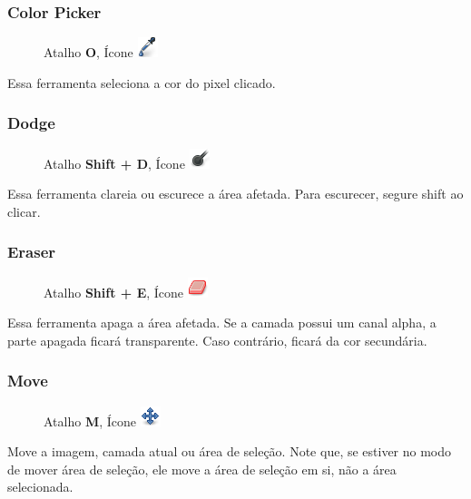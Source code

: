 \documentclass[12pt,onecolumn]{article}
\begin{document}
    \subsubsection{Color Picker}
      \begin{figure}[H]
        Atalho {\bf O}, Ícone
        \includegraphics{gimp-icons/stock-tool-color-picker-22.png}
        \label{fig:color-picker}
      \end{figure}
      Essa ferramenta seleciona a cor do pixel clicado.
      
    \subsubsection{Dodge}
      \begin{figure}[H]
        Atalho {\bf Shift + D}, Ícone
        \includegraphics{gimp-icons/stock-tool-dodge-22.png}
        \label{fig:dodge}
      \end{figure}
      Essa ferramenta clareia ou escurece a área afetada. Para escurecer, segure shift ao clicar.

    \subsubsection{Eraser}
      \begin{figure}[H]
        Atalho {\bf Shift + E}, Ícone
        \includegraphics{gimp-icons/stock-tool-eraser-22.png}
        \label{fig:eraser}
      \end{figure}
      Essa ferramenta apaga a área afetada. Se a camada possui um canal alpha, a parte apagada ficará
      transparente. Caso contrário, ficará da cor secundária.


    \subsubsection{Move}
      \begin{figure}[H]
        Atalho {\bf M}, Ícone
        \includegraphics{gimp-icons/stock-tool-move-22.png}
        \label{fig:move}
      \end{figure}
      Move a imagem, camada atual ou área de seleção. Note que, se estiver no modo de mover área de
      seleção, ele move a área de seleção em si, não a área selecionada.
\end{document}
